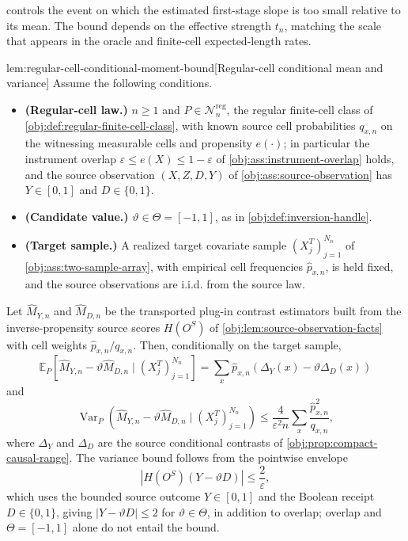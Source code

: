 \documentclass[11pt]{article}
\begin{document}
 controls the event on which the estimated first-stage slope is too small relative to its mean. The bound depends on the effective strength \(t_n\), matching the scale that appears in the oracle and finite-cell expected-length rates.

\begin{lemmav}{lem:regular-cell-conditional-moment-bound}[Regular-cell conditional mean and variance]
Assume the following conditions.
\begin{itemize}
\item \textbf{(Regular-cell law.)} \(n\ge1\) and \(P\in\mathcal N_n^{\mathrm{reg}}\), the regular finite-cell class of \cref{obj:def:regular-finite-cell-class}, with known source cell probabilities \(q_{x,n}\) on the witnessing measurable cells and propensity \(e(\cdot)\); in particular the instrument overlap \(\varepsilon\le e(X)\le1-\varepsilon\) of \cref{obj:ass:instrument-overlap} holds, and the source observation \((X,Z,D,Y)\) of \cref{obj:ass:source-observation} has \(Y\in[0,1]\) and \(D\in\{0,1\}\).
\item \textbf{(Candidate value.)} \(\vartheta\in\Theta=[-1,1]\), as in \cref{obj:def:inversion-handle}.
\item \textbf{(Target sample.)} A realized target covariate sample \((X_j^T)_{j=1}^{N_n}\) of \cref{obj:ass:two-sample-array}, with empirical cell frequencies \(\widehat p_{x,n}\), is held fixed, and the source observations are i.i.d. from the source law.
\end{itemize}
Let \(\widehat M_{Y,n}\) and \(\widehat M_{D,n}\) be the transported plug-in contrast estimators built from the inverse-propensity source scores \(H(O^S)\) of \cref{obj:lem:source-observation-facts} with cell weights \(\widehat p_{x,n}/q_{x,n}\). Then, conditionally on the target sample,
\[
\mathbb E_P\!\left[\widehat M_{Y,n}-\vartheta\widehat M_{D,n}\mid(X_j^T)_{j=1}^{N_n}\right]
=\sum_x\widehat p_{x,n}\left(\Delta_Y(x)-\vartheta\Delta_D(x)\right)
\]
and
\[
\operatorname{Var}_P\!\left(\widehat M_{Y,n}-\vartheta\widehat M_{D,n}\mid(X_j^T)_{j=1}^{N_n}\right)
\le\frac{4}{\varepsilon^2n}\sum_x\frac{\widehat p_{x,n}^2}{q_{x,n}},
\]
where \(\Delta_Y\) and \(\Delta_D\) are the source conditional contrasts of \cref{obj:prop:compact-causal-range}. The variance bound follows from the pointwise envelope
\[
\left|H(O^S)(Y-\vartheta D)\right|\le\frac2\varepsilon,
\]
which uses the bounded source outcome \(Y\in[0,1]\) and the Boolean receipt \(D\in\{0,1\}\), giving \(|Y-\vartheta D|\le2\) for \(\vartheta\in\Theta\), in addition to overlap; overlap and \(\Theta=[-1,1]\) alone do not entail the bound.
\end{lemmav}
\end{document}
